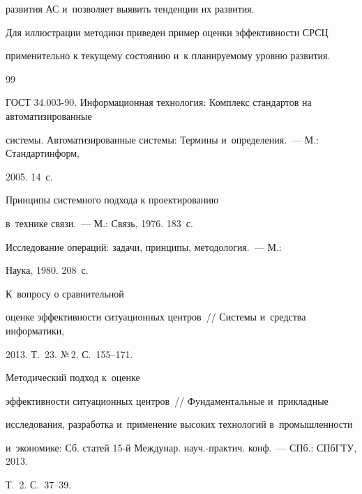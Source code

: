 развития АС и~позволяет выявить тенденции их развития.

      

      Для иллюстрации методики приведен пример оценки эффективности СРСЦ 

применительно к текущему состоянию и~к планируемому уровню развития.

      

{\small\frenchspacing

{%


\begin{thebibliography}{99}


ГОСТ 34.003-90. Информационная технология: Комплекс стандартов на автоматизированные 

системы. Автоматизированные системы: Термины и~определения.~--- М.: Стандартинформ, 

2005. 14~с.


 Принципы системного подхода к проектированию 

в~технике связи.~--- М.: Связь, 1976. 183~с.


 Исследование операций: задачи, принципы, методология.~--- М.: 

Наука, 1980. 208~с. 


 К~вопросу о сравнительной 

оценке эффективности ситуационных центров~/\!\!/ Системы и~средства информатики, 

2013. Т.~23. №\,2. С.~155--171.


 Методический подход к~оценке 

эффективности ситуационных центров~/\!\!/ Фундаментальные и~прикладные 

исследования, разработка и~применение высоких технологий в~промышленности 

и~экономике: Сб. статей 15-й Междунар. науч.-практич. конф.~--- СПб.: СПбГТУ, 2013. 

Т.~2. С.~37--39.



\end{thebibliography}}}
